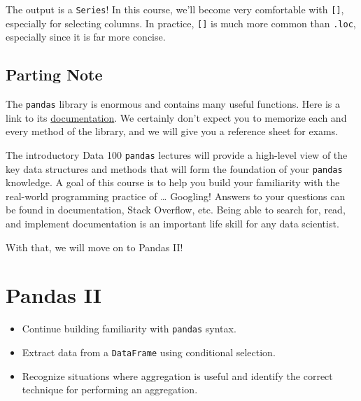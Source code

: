 \documentclass[
  letterpaper,
  DIV=11,
  numbers=noendperiod]{scrreprt}
\providecommand{\tightlist}{%
  \setlength{\itemsep}{0pt}\setlength{\parskip}{0pt}}\usepackage{longtable,booktabs,array}
\begin{document}
The output is a \texttt{Series}! In this course, we'll become very
comfortable with \texttt{{[}{]}}, especially for selecting columns. In
practice, \texttt{{[}{]}} is much more common than \texttt{.loc},
especially since it is far more concise.

\hypertarget{parting-note}{%
\section{Parting Note}\label{parting-note}}

The \texttt{pandas} library is enormous and contains many useful
functions. Here is a link to its
\href{https://pandas.pydata.org/docs/}{documentation}. We certainly
don't expect you to memorize each and every method of the library, and
we will give you a reference sheet for exams.

The introductory Data 100 \texttt{pandas} lectures will provide a
high-level view of the key data structures and methods that will form
the foundation of your \texttt{pandas} knowledge. A goal of this course
is to help you build your familiarity with the real-world programming
practice of \ldots{} Googling! Answers to your questions can be found in
documentation, Stack Overflow, etc. Being able to search for, read, and
implement documentation is an important life skill for any data
scientist.

With that, we will move on to Pandas II!


\hypertarget{pandas-ii}{%
\chapter{Pandas II}\label{pandas-ii}}

\begin{tcolorbox}[enhanced jigsaw, titlerule=0mm, breakable, opacityback=0, leftrule=.75mm, opacitybacktitle=0.6, colback=white, colframe=quarto-callout-note-color-frame, colbacktitle=quarto-callout-note-color!10!white, left=2mm, rightrule=.15mm, arc=.35mm, toprule=.15mm, coltitle=black, bottomrule=.15mm, bottomtitle=1mm, toptitle=1mm, title=\textcolor{quarto-callout-note-color}{\faInfo}\hspace{0.5em}{Learning Outcomes}]

\begin{itemize}
\tightlist
\item
  Continue building familiarity with \texttt{pandas} syntax.
\item
  Extract data from a \texttt{DataFrame} using conditional selection.
\item
  Recognize situations where aggregation is useful and identify the
  correct technique for performing an aggregation.
\end{itemize}

\end{tcolorbox}
\end{document}
